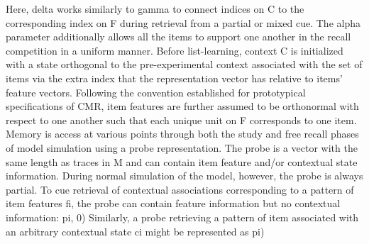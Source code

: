 {}Here, \markdownRendererDollarSign{}\markdownRendererBackslash{}delta\markdownRendererDollarSign{} works similarly to \markdownRendererDollarSign{}\markdownRendererBackslash{}gamma\markdownRendererDollarSign{} to connect indices on \markdownRendererDollarSign{}C\markdownRendererDollarSign{} to the corresponding index on \markdownRendererDollarSign{}F\markdownRendererDollarSign{} during retrieval from a partial or mixed cue. The \markdownRendererDollarSign{}\markdownRendererBackslash{}alpha\markdownRendererDollarSign{} parameter additionally allows all the items to support one another in the recall competition in a uniform manner.\markdownRendererInterblockSeparator
{}Before list-learning, context \markdownRendererDollarSign{}C\markdownRendererDollarSign{} is initialized with a state orthogonal to the pre-experimental context associated with the set of items via the extra index that the representation vector has relative to items' feature vectors. Following the convention established for prototypical specifications of CMR, item features are further assumed to be orthonormal with respect to one another such that each unique unit on \markdownRendererDollarSign{}F\markdownRendererDollarSign{} corresponds to one item.\markdownRendererInterblockSeparator
{}\markdownRendererInterblockSeparator
{}Memory is access at various points through both the study and free recall phases of model simulation using a probe representation. The probe is a vector with the same length as traces in \markdownRendererDollarSign{}M\markdownRendererDollarSign{} and can contain item feature and/or contextual state information. During normal simulation of the model, however, the probe is always partial. To cue retrieval of contextual associations corresponding to a pattern of item features \markdownRendererDollarSign{}f\markdownRendererUnderscore{}i\markdownRendererDollarSign{}, the probe can contain feature information but no contextual information:\markdownRendererInterblockSeparator
{}\markdownRendererDollarSign{}\markdownRendererDollarSign{}pi, 0)\markdownRendererDollarSign{}\markdownRendererDollarSign{}\markdownRendererInterblockSeparator
{}Similarly, a probe retrieving a pattern of item associated with an arbitrary contextual state \markdownRendererDollarSign{}c\markdownRendererUnderscore{}i\markdownRendererDollarSign{} might be represented as\markdownRendererInterblockSeparator
{}\markdownRendererDollarSign{}\markdownRendererDollarSign{}pi)\markdownRendererDollarSign{}\markdownRendererDollarSign{}\markdownRendererInterblockSeparator
